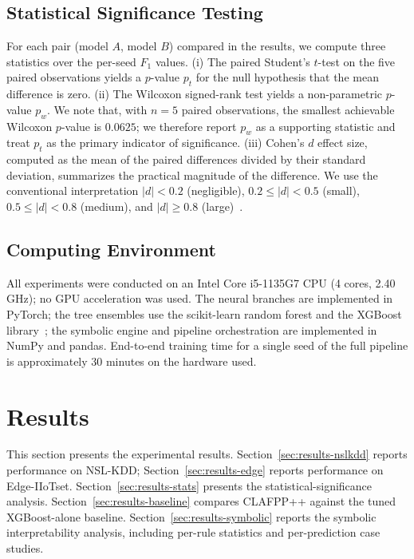 \documentclass[pdflatex,sn-mathphys-num]{sn-jnl}
\theoremstyle{thmstyleone}
\theoremstyle{thmstyletwo}
\theoremstyle{thmstylethree}
\begin{document}
\subsection{Statistical Significance Testing}\label{sec:setup-stats}

For each pair (model $A$, model $B$) compared in the results, we compute three statistics over the per-seed $F_1$ values. (i) The paired Student's $t$-test on the five paired observations yields a $p$-value $p_t$ for the null hypothesis that the mean difference is zero. (ii) The Wilcoxon signed-rank test yields a non-parametric $p$-value $p_w$. We note that, with $n=5$ paired observations, the smallest achievable Wilcoxon $p$-value is $0.0625$; we therefore report $p_w$ as a supporting statistic and treat $p_t$ as the primary indicator of significance. (iii) Cohen's $d$ effect size, computed as the mean of the paired differences divided by their standard deviation, summarizes the practical magnitude of the difference. We use the conventional interpretation $|d| < 0.2$ (negligible), $0.2 \le |d| < 0.5$ (small), $0.5 \le |d| < 0.8$ (medium), and $|d| \ge 0.8$ (large)~\cite{cohen1988statistical}.

\subsection{Computing Environment}\label{sec:setup-compute}

All experiments were conducted on an Intel Core i5-1135G7 CPU
(4 cores, 2.40\,GHz); no GPU acceleration was used. The neural branches are implemented in PyTorch; the tree ensembles use the scikit-learn random forest and the XGBoost library~\cite{chen2016xgboost}; the symbolic engine and pipeline orchestration are implemented in NumPy and pandas. End-to-end training time for a single seed of the full pipeline is approximately $30$ minutes on the hardware used.

\section{Results}\label{sec:results}

This section presents the experimental results. Section~\ref{sec:results-nslkdd} reports performance on NSL-KDD; Section~\ref{sec:results-edge} reports performance on Edge-IIoTset. Section~\ref{sec:results-stats} presents the statistical-significance analysis. Section~\ref{sec:results-baseline} compares CLAFPP++ against the tuned XGBoost-alone baseline. Section~\ref{sec:results-symbolic} reports the symbolic interpretability analysis, including per-rule statistics and per-prediction case studies.
\end{document}
